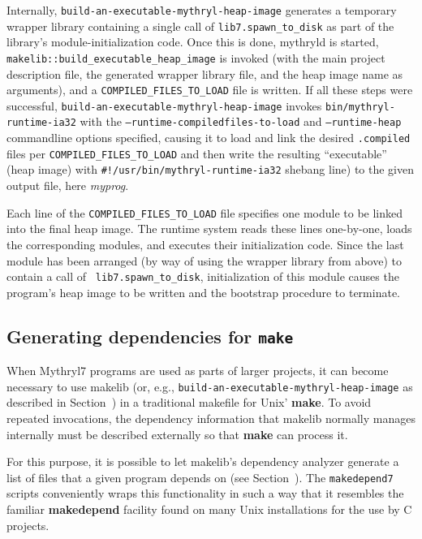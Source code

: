 Internally, {\tt build-an-executable-mythryl-heap-image} generates a temporary wrapper library
containing a single call of {\tt lib7.spawn_to_disk} as part of the
library's module-initialization code.  Once this is done, mythryld is
started, {\tt makelib::build_executable_heap_image} is invoked (with the main project
description file, the generated wrapper library file, and the heap
image name as arguments), and a {\tt COMPILED_FILES_TO_LOAD} file is written.
If all these steps were successful, {\tt build-an-executable-mythryl-heap-image}
invokes {\tt bin/mythryl-runtime-ia32} with the {\tt --runtime-compiledfiles-to-load} and
{\tt --runtime-heap} commandline options specified, causing it to load and link the
desired {\tt .compiled} files per {\tt COMPILED_FILES_TO_LOAD} and then
write the resulting ``executable'' (heap image) with {\tt #!/usr/bin/mythryl-runtime-ia32} shebang line)
to the given output file, here {\em myprog}.

Each line of the {\tt COMPILED_FILES_TO_LOAD} file specifies one module to be linked
into the final heap image.  The runtime system reads these
lines one-by-one, loads the corresponding modules, and executes their
initialization code.  Since the last module has been arranged (by way
of using the wrapper library from above) to contain a call of {\tt
lib7.spawn_to_disk}, initialization of this module causes the program's
heap image to be written and the bootstrap procedure to terminate.

\subsection{Generating dependencies for {\tt make}}
\label{sec:makedepend}

When Mythryl7 programs are used as parts of larger projects, it can become
necessary to use makelib (or, e.g., {\tt build-an-executable-mythryl-heap-image}
as described in Section~)
in a traditional makefile for Unix' {\bf make}.
To avoid repeated invocations, the dependency information that
makelib normally manages internally must be described externally so that
{\bf make} can process it.

For this purpose, it is possible to let makelib's dependency analyzer
generate a list of files that a given program depends on (see
Section~).  The {\tt makedepend7}
scripts conveniently wraps this functionality in such a way that it
resembles the familiar {\bf makedepend} facility found on many Unix
installations for the use by C projects.

